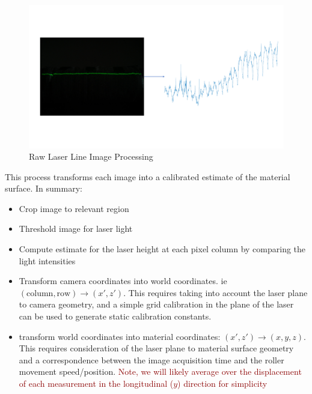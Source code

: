\documentclass[12pt]{report}
\newcommand{\tcr}[1]{\textcolor{darkRed}{#1}}
\begin{document}
\begin{figure}[ht!]
    \centering
    \includegraphics[width=\textwidth,trim={0 5cm 0 5cm},clip]{figures/profile_measure/temp_height_measure.pdf}
    \caption{Raw Laser Line Image Processing}
\end{figure}
This process transforms each image into a calibrated estimate of the material surface. In summary:
    
\begin{itemize}
    \item Crop image to relevant region
    \item Threshold image for laser light
    \item Compute estimate for the laser height at each pixel column by comparing the light intensities
    \item Transform camera coordinates into world coordinates.
    ie $(\text{column}, \text{row}) \rightarrow (x',z')$. This requires taking into account the laser plane to camera geometry, and a simple grid calibration in the plane of the laser can be used to generate static calibration constants.
    \item transform world coordinates into material coordinates: $(x',z') \rightarrow (x,y,z)$. This requires consideration of the laser plane to material surface geometry and a correspondence between the image acquisition time and the roller movement speed/position. \tcr{Note, we will likely average over the displacement of each measurement in the longitudinal ($y$) direction for simplicity}
\end{itemize}
    
\end{document}
